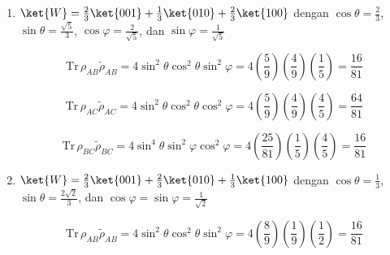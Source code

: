 \begin{enumerate}
	sehingga $\det c_{1BC}^0 = 0$
	
	\begin{equation}
		c_{0BC}^1=
		\begin{pmatrix}
			c_{100} & c_{101} \\
			c_{010} & c_{011}
		\end{pmatrix}=
		\begin{pmatrix}
			\frac{2}{3} & 0 \\
			\frac{2}{3} & 0
		\end{pmatrix}
	\end{equation}
	
	sehingga $\det c_{0BC}^1 = 0$.
	
	Maka
	\begin{equation}
		\mathrm{Tr}\,\rho_{BC}\tilde{\rho}_{BC}=4|\det c_{0BC}|^2=4(-\frac{2}{9})^2=\frac{16}{81}
	\end{equation}
	
	\item { $\ket{W}=\frac{2}{3}\ket{001}+\frac{1}{3}\ket{010}+\frac{2}{3}\ket{100}$}
	dengan $\cos\theta=\frac{2}{3}$, $\sin\theta=\frac{\sqrt{5}}{3}$, $\cos\varphi=\frac{2}{\sqrt{5}}$, dan $\sin\varphi=\frac{1}{\sqrt{5}}$
	
	\begin{equation}
		\mathrm{Tr}\,\rho_{AB}\tilde{\rho}_{AB}=4\sin^2\theta \cos^2\theta \sin^2\varphi=4(\frac{5}{9})(\frac{4}{9})(\frac{1}{5})=\frac{16}{81}
	\end{equation}
	
	\begin{equation}
		\mathrm{Tr}\,\rho_{AC}\tilde{\rho}_{AC}=4\sin^2\theta \cos^2\theta \cos^2\varphi=4(\frac{5}{9})(\frac{4}{9})(\frac{4}{5})=\frac{64}{81}
	\end{equation}
	
	\begin{equation}
		\mathrm{Tr}\,\rho_{BC}\tilde{\rho}_{BC}=4\sin^4\theta \sin^2\varphi\cos^2\varphi=4(\frac{25}{81})(\frac{1}{5})(\frac{4}{5})=\frac{16}{81}
	\end{equation}
	
	\item { $\ket{W}=\frac{2}{3}\ket{001}+\frac{2}{3}\ket{010}+\frac{1}{3}\ket{100}$}
	dengan $\cos\theta=\frac{1}{3}$, $\sin\theta=\frac{2\sqrt{2}}{3}$, dan $\cos\varphi=\sin\varphi=\frac{1}{\sqrt{2}}$
	
	\begin{equation}
		\mathrm{Tr}\,\rho_{AB}\tilde{\rho}_{AB}=4\sin^2\theta \cos^2\theta \sin^2\varphi=4(\frac{8}{9})(\frac{1}{9})(\frac{1}{2})=\frac{16}{81}
	\end{equation}
	

\end{enumerate}
